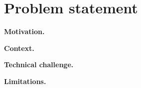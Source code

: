 
\section{Problem statement}

\textbf{Motivation.}

\textbf{Context.}

\textbf{Technical challenge.}

\textbf{Limitations.}

\nocite{Haykin:Communication_Systems}


